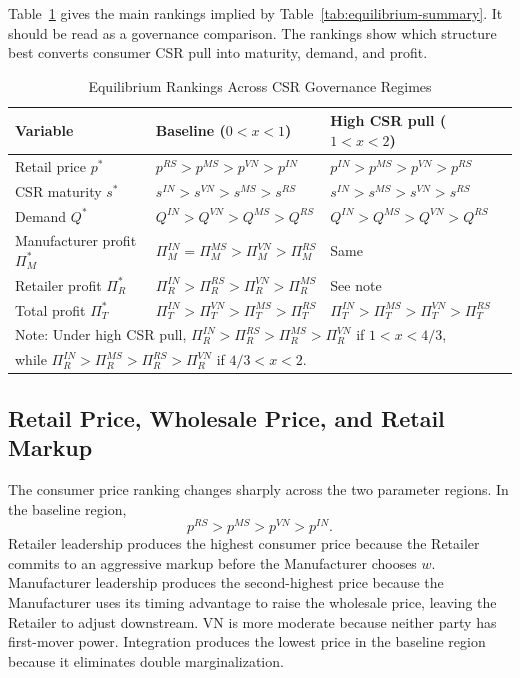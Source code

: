 Table~\ref{tab:rankings} gives the main rankings implied by Table~\ref{tab:equilibrium-summary}. It should be read as a governance comparison. The rankings show which structure best converts consumer CSR pull into maturity, demand, and profit.

\begin{table}[htbp]
\centering
\scriptsize
\renewcommand{\arraystretch}{1.35}
\setlength{\tabcolsep}{3pt}
\caption{Equilibrium Rankings Across CSR Governance Regimes}
\label{tab:rankings}
\begin{tabular}{lll}
\toprule
\textbf{Variable} & \textbf{Baseline ($0<x<1$)} & \textbf{High CSR pull ($1<x<2$)} \\
\midrule
Retail price $p^*$ & $p^{RS}>p^{MS}>p^{VN}>p^{IN}$ & $p^{IN}>p^{MS}>p^{VN}>p^{RS}$ \\
CSR maturity $s^*$ & $s^{IN}>s^{VN}>s^{MS}>s^{RS}$ & $s^{IN}>s^{MS}>s^{VN}>s^{RS}$ \\
Demand $Q^*$ & $Q^{IN}>Q^{VN}>Q^{MS}>Q^{RS}$ & $Q^{IN}>Q^{MS}>Q^{VN}>Q^{RS}$ \\
Manufacturer profit $\Pi_M^*$ & $\Pi_M^{IN}=\Pi_M^{MS}>\Pi_M^{VN}>\Pi_M^{RS}$ & Same \\
Retailer profit $\Pi_R^*$ & $\Pi_R^{IN}>\Pi_R^{RS}>\Pi_R^{VN}>\Pi_R^{MS}$ & See note \\
Total profit $\Pi_T^*$ & $\Pi_T^{IN}>\Pi_T^{VN}>\Pi_T^{MS}>\Pi_T^{RS}$ & $\Pi_T^{IN}>\Pi_T^{MS}>\Pi_T^{VN}>\Pi_T^{RS}$ \\
\bottomrule
\multicolumn{3}{l}{\footnotesize Note: Under high CSR pull, $\Pi_R^{IN}>\Pi_R^{RS}>\Pi_R^{MS}>\Pi_R^{VN}$ if $1<x<4/3$,} \\
\multicolumn{3}{l}{\footnotesize while $\Pi_R^{IN}>\Pi_R^{MS}>\Pi_R^{RS}>\Pi_R^{VN}$ if $4/3<x<2$.} \\
\end{tabular}
\end{table}

\subsection{Retail Price, Wholesale Price, and Retail Markup}
\label{sec:wm-comparison}

The consumer price ranking changes sharply across the two parameter regions. In the baseline region,
\begin{equation*}
    p^{RS}>p^{MS}>p^{VN}>p^{IN}.
\end{equation*}
Retailer leadership produces the highest consumer price because the Retailer commits to an aggressive markup before the Manufacturer chooses $w$. Manufacturer leadership produces the second-highest price because the Manufacturer uses its timing advantage to raise the wholesale price, leaving the Retailer to adjust downstream. VN is more moderate because neither party has first-mover power. Integration produces the lowest price in the baseline region because it eliminates double marginalization.


